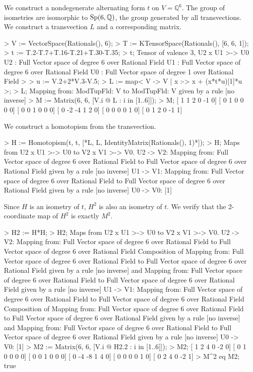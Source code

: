 \begin{example}[HomotopismOps]

We construct a nondegenerate alternating form $t$ on $V=\mathbb{Q}^6$. 
The group of isometries are isomorphic to $\operatorname{Sp}(6, \mathbb{Q})$, the group generated by all transvections.
We construct a transvection $L$ and a corresponding matrix.
\begin{code}
> V := VectorSpace(Rationals(), 6);
> T := KTensorSpace(Rationals(), [6, 6, 1]);
> t := T.2-T.7+T.16-T.21+T.30-T.35;
> t;
Tensor of valence 3, U2 x U1 >-> U0
U2 : Full Vector space of degree 6 over Rational Field
U1 : Full Vector space of degree 6 over Rational Field
U0 : Full Vector space of degree 1 over Rational Field
> 
> u := V.2+2*V.3-V.5;
> L := map< V -> V | x :-> x + (x*t*u)[1]*u >;
> L;
Mapping from: ModTupFld: V to ModTupFld: V given by a rule [no inverse]
> M := Matrix(6, 6, [V.i @ L : i in [1..6]]);
> M;
[ 1  1  2  0 -1  0]
[ 0  1  0  0  0  0]
[ 0  0  1  0  0  0]
[ 0 -2 -4  1  2  0]
[ 0  0  0  0  1  0]
[ 0  1  2  0 -1  1]
\end{code}

We construct a homotopism from the transvection.
\begin{code}
> H := Homotopism(t, t, [*L, L, IdentityMatrix(Rationals(), 1)*]);
> H;
Maps from U2 x U1 >-> U0 to V2 x V1 >-> V0.
U2 -> V2: Mapping from: Full Vector space of degree 6 over Rational Field to 
Full Vector space of degree 6 over Rational Field given by a rule [no inverse]
U1 -> V1: Mapping from: Full Vector space of degree 6 over Rational Field to 
Full Vector space of degree 6 over Rational Field given by a rule [no inverse]
U0 -> V0: 
[1]
\end{code}

Since $H$ is an isometry of $t$, $H^2$ is also an isometry of $t$. 
We verify that the 2-coordinate map of $H^2$ is exactly $M^2$.
\begin{code}
> H2 := H*H;
> H2;
Maps from U2 x U1 >-> U0 to V2 x V1 >-> V0.
U2 -> V2: Mapping from: Full Vector space of degree 6 over Rational Field to 
Full Vector space of degree 6 over Rational Field
Composition of Mapping from: Full Vector space of degree 6 over Rational Field 
to Full Vector space of degree 6 over Rational Field given by a rule [no 
inverse] and
Mapping from: Full Vector space of degree 6 over Rational Field to Full Vector 
space of degree 6 over Rational Field given by a rule [no inverse]
U1 -> V1: Mapping from: Full Vector space of degree 6 over Rational Field to 
Full Vector space of degree 6 over Rational Field
Composition of Mapping from: Full Vector space of degree 6 over Rational Field 
to Full Vector space of degree 6 over Rational Field given by a rule [no 
inverse] and
Mapping from: Full Vector space of degree 6 over Rational Field to Full Vector 
space of degree 6 over Rational Field given by a rule [no inverse]
U0 -> V0: 
[1]
> M2 := Matrix(6, 6, [V.i @ H2.2 : i in [1..6]]);
> M2;
[ 1  2  4  0 -2  0]
[ 0  1  0  0  0  0]
[ 0  0  1  0  0  0]
[ 0 -4 -8  1  4  0]
[ 0  0  0  0  1  0]
[ 0  2  4  0 -2  1]
> M^2 eq M2;
true
\end{code}
\end{example}

